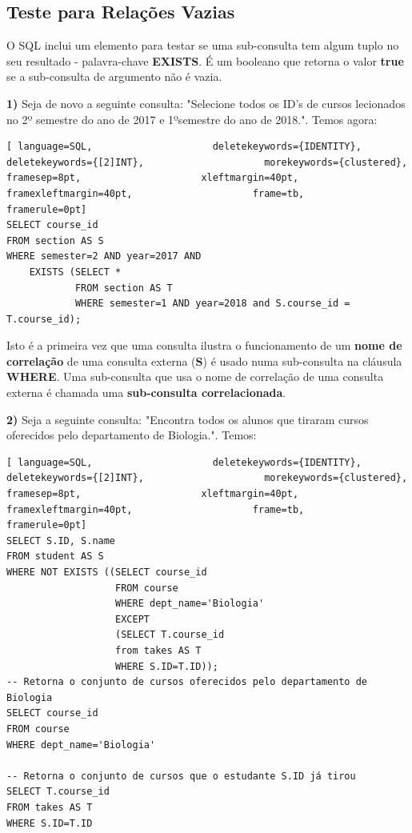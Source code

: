 \documentclass[titlepage]{book}
\theoremstyle{definition}
\begin{document}
\subsection{Teste para Relações Vazias}
O SQL inclui um elemento para testar se uma sub-consulta tem algum tuplo no seu resultado - palavra-chave \textbf{EXISTS}. É um booleano que retorna o valor \textbf{true} se a sub-consulta de argumento não é vazia.

\textbf{1)} Seja de novo a seguinte consulta: "Selecione todos os ID's de cursos lecionados no 2º semestre do ano de 2017 e 1ºsemestre do ano de 2018.". Temos agora:
\begin{lstlisting}[ language=SQL,                     deletekeywords={IDENTITY},                     deletekeywords={[2]INT},                     morekeywords={clustered},                     framesep=8pt,                     xleftmargin=40pt,                     framexleftmargin=40pt,                     frame=tb,                     framerule=0pt]
SELECT course_id
FROM section AS S 
WHERE semester=2 AND year=2017 AND
    EXISTS (SELECT *
            FROM section AS T
            WHERE semester=1 AND year=2018 and S.course_id = T.course_id);
\end{lstlisting}
Isto é a primeira vez que uma consulta ilustra o funcionamento de um \textbf{nome de correlação} de uma consulta externa (\textbf{S}) é usado numa sub-consulta na cláusula \textbf{WHERE}. Uma sub-consulta que usa o nome de correlação de uma consulta externa é chamada uma \textbf{sub-consulta correlacionada}.

\textbf{2)} Seja a seguinte consulta: "Encontra todos os alunos que tiraram cursos oferecidos pelo departamento de Biologia.". Temos:
\begin{lstlisting}[ language=SQL,                     deletekeywords={IDENTITY},                     deletekeywords={[2]INT},                     morekeywords={clustered},                     framesep=8pt,                     xleftmargin=40pt,                     framexleftmargin=40pt,                     frame=tb,                     framerule=0pt]
SELECT S.ID, S.name
FROM student AS S 
WHERE NOT EXISTS ((SELECT course_id
                   FROM course
                   WHERE dept_name='Biologia'
                   EXCEPT
                   (SELECT T.course_id
                   from takes AS T
                   WHERE S.ID=T.ID));
-- Retorna o conjunto de cursos oferecidos pelo departamento de Biologia
SELECT course_id
FROM course
WHERE dept_name='Biologia'

-- Retorna o conjunto de cursos que o estudante S.ID já tirou
SELECT T.course_id
FROM takes AS T
WHERE S.ID=T.ID
\end{lstlisting}
\end{document}
